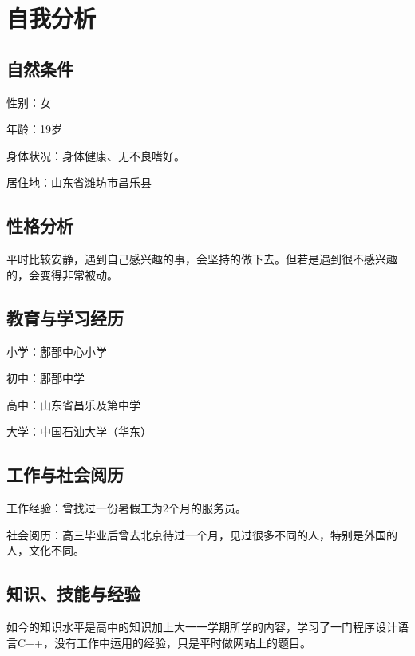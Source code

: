 \documentclass{article}
\begin{document}
\thispagestyle{empty}
\newpage
\setcounter{page}{1}
\section{自我分析}
	
	\par
	
\subsection{自然条件}\par
性别：女\par
年龄：19岁\par
身体状况：身体健康、无不良嗜好。\par
居住地：山东省潍坊市昌乐县\par

\subsection{性格分析}
\par
平时比较安静，遇到自己感兴趣的事，会坚持的做下去。但若是遇到很不感兴趣的，会变得非常被动。\par
\subsection{教育与学习经历}
\par
小学：鄌郚中心小学\par
初中：鄌郚中学\par
高中：山东省昌乐及第中学\par
大学：中国石油大学（华东）\par

\subsection{工作与社会阅历}
\par
工作经验：曾找过一份暑假工为2个月的服务员。\par
社会阅历：高三毕业后曾去北京待过一个月，见过很多不同的人，特别是外国的人，文化不同。\par

\subsection{知识、技能与经验}
\par
如今的知识水平是高中的知识加上大一一学期所学的内容，学习了一门程序设计语言C++，没有工作中运用的经验，只是平时做网站上的题目。\par
\end{document}

